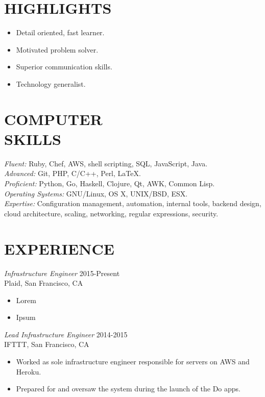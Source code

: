 \documentclass[line,margin]{res}
\begin{document}
\address{\,\,\,\,\,\,\,\,\,\,\,\,\,\,\,\,\,\,\,\,\, dana.merrick@gmail.com} %
\address{San Francisco, CA -- 978.206.1331}

\begin{resume}

\section{HIGHLIGHTS}
  \begin{itemize}  \itemsep -2pt %
    \item Detail oriented, fast learner.
    \item Motivated problem solver.
    \item Superior communication skills.
    \item Technology generalist.
  \end{itemize}
  
\section{COMPUTER \\ SKILLS}
  {\sl Fluent:}
  Ruby,
  Chef,
  AWS,
  shell scripting,
  SQL,
  JavaScript,
  Java.
  \\
  {\sl Advanced:}
  Git,
  PHP,
  C/C++,
  Perl,
  \LaTeX.
  \\
  {\sl Proficient:}
  Python,
  Go,
  Haskell,
  Clojure,
  Qt,
  AWK,
  Common Lisp.
  \\
  {\sl Operating Systems:}
  GNU/Linux, OS X, UNIX/BSD, ESX.
  \\
  {\sl Expertise:}
  Configuration management,
  automation,
  internal tools,
  backend design,
  cloud architecture,
  scaling,
  networking,
  regular expressions,
  security.

\section{EXPERIENCE}
  {\sl Infrastructure Engineer}  \hfill 2015-Present \\
  Plaid,
  San Francisco, CA
  \begin{itemize}  \itemsep -2pt %
    \item Lorem
    \item Ipsum
  \end{itemize}

  {\sl Lead Infrastructure Engineer}  \hfill 2014-2015 \\
  IFTTT,
  San Francisco, CA
  \begin{itemize}  \itemsep -2pt %
    \item Worked as sole infrastructure engineer responsible for servers on AWS and Heroku.
    \item Prepared for and oversaw the system during the launch of the Do apps.
 

\end{itemize}
\end{resume}
\end{document}
